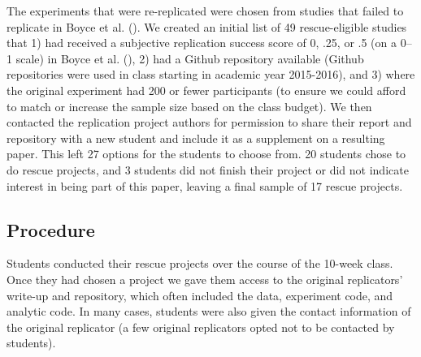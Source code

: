 \documentclass[
  english,
  a4paper,
]{article}
\begin{document}
The experiments that were re-replicated were chosen from studies that failed to replicate in Boyce et al. ().
We created an initial list of 49 rescue-eligible studies that 1) had received a subjective replication success score of 0, .25, or .5 (on a 0--1 scale) in Boyce et al. (), 2) had a Github repository available (Github repositories were used in class starting in academic year 2015-2016), and 3) where the original experiment had 200 or fewer participants (to ensure we could afford to match or increase the sample size based on the class budget).
We then contacted the replication project authors for permission to share their report and repository with a new student and include it as a supplement on a resulting paper.
This left 27 options for the students to choose from.
20 students chose to do rescue projects, and 3 students did not finish their project or did not indicate interest in being part of this paper, leaving a final sample of 17 rescue projects.

\subsection{Procedure}\label{procedure}

Students conducted their rescue projects over the course of the 10-week class.
Once they had chosen a project we gave them access to the original replicators' write-up and repository, which often included the data, experiment code, and analytic code.
In many cases, students were also given the contact information of the original replicator (a few original replicators opted not to be contacted by students).
\end{document}
